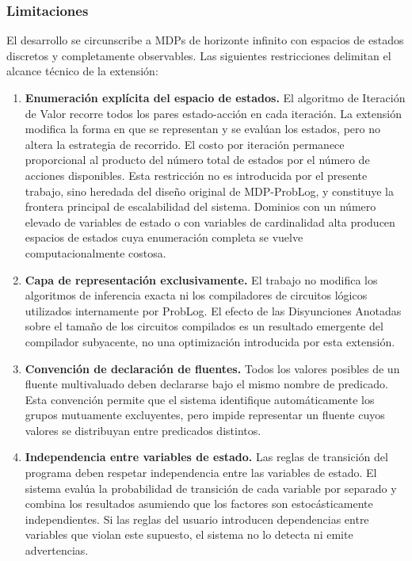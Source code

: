 \clearpage

\subsubsection{Limitaciones}
\label{subsec:limitaciones}

El desarrollo se circunscribe a MDPs de horizonte infinito con espacios de
estados discretos y completamente observables. Las siguientes restricciones
delimitan el alcance técnico de la extensión:

\begin{enumerate}
    \item \textbf{Enumeración explícita del espacio de estados.} El algoritmo
    de Iteración de Valor recorre todos los pares estado-acción en cada
    iteración. La extensión modifica la forma en que se representan y se
    evalúan los estados, pero no altera la estrategia de recorrido. El costo
    por iteración permanece proporcional al producto del número total de
    estados por el número de acciones disponibles. Esta restricción no es
    introducida por el presente trabajo, sino heredada del diseño original
    de MDP-ProbLog, y constituye la frontera principal de escalabilidad
    del sistema. Dominios con un número elevado de variables de estado o
    con variables de cardinalidad alta producen espacios de estados cuya
    enumeración completa se vuelve computacionalmente costosa.

    \item \textbf{Capa de representación exclusivamente.} El trabajo no
    modifica los algoritmos de inferencia exacta ni los compiladores de
    circuitos lógicos utilizados internamente por ProbLog. El efecto de
    las Disyunciones Anotadas sobre el tamaño de los circuitos compilados
    es un resultado emergente del compilador subyacente, no una
    optimización introducida por esta extensión.

    \item \textbf{Convención de declaración de fluentes.} Todos los valores
    posibles de un fluente multivaluado deben declararse bajo el mismo nombre
    de predicado. Esta convención permite que el sistema identifique
    automáticamente los grupos mutuamente excluyentes, pero impide
    representar un fluente cuyos valores se distribuyan entre predicados
    distintos.

    \item \textbf{Independencia entre variables de estado.} Las reglas de
    transición del programa deben respetar independencia entre las variables
    de estado. El sistema evalúa la probabilidad de transición de cada
    variable por separado y combina los resultados asumiendo que los
    factores son estocásticamente independientes. Si las reglas del usuario
    introducen dependencias entre variables que violan este supuesto, el
    sistema no lo detecta ni emite advertencias.


\end{enumerate}
